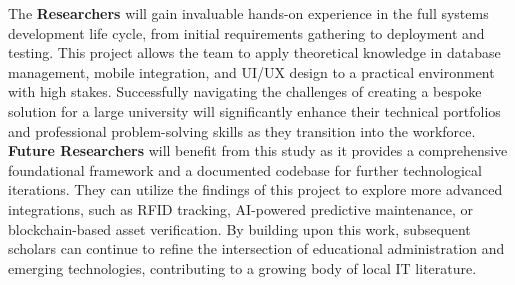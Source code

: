 {The \textbf{Researchers} will gain invaluable hands-on experience in the full systems development life cycle, from initial requirements gathering to deployment and testing. This project allows the team to apply theoretical knowledge in database management, mobile integration, and UI/UX design to a practical environment with high stakes. Successfully navigating the challenges of creating a bespoke solution for a large university will significantly enhance their technical portfolios and professional problem-solving skills as they transition into the workforce.\\

\textbf{Future Researchers} will benefit from this study as it provides a comprehensive foundational framework and a documented codebase for further technological iterations. They can utilize the findings of this project to explore more advanced integrations, such as RFID tracking, AI-powered predictive maintenance, or blockchain-based asset verification. By building upon this work, subsequent scholars can continue to refine the intersection of educational administration and emerging technologies, contributing to a growing body of local IT literature.

}
